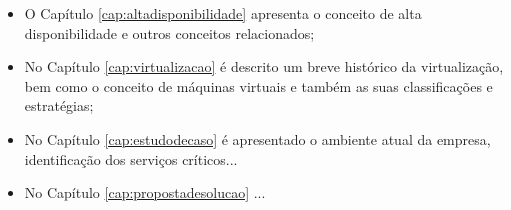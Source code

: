 \begin{itemize}
 \item O Capítulo \ref{cap:altadisponibilidade} apresenta o conceito de alta disponibilidade e outros conceitos relacionados;
 \item No Capítulo \ref{cap:virtualizacao} é descrito um breve histórico da virtualização, bem como o conceito de máquinas virtuais 
 e também as suas classificações e estratégias;
 \item No Capítulo \ref{cap:estudodecaso} é apresentado o ambiente atual da empresa, identificação dos serviços críticos...
 \item No Capítulo \ref{cap:propostadesolucao} ...
\end{itemize}
